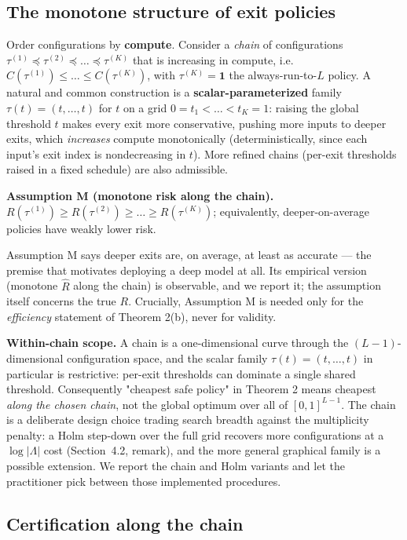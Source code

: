 \documentclass{ieeeaccess}
\begin{document}
\subsection{The monotone structure of exit policies}

Order configurations by \textbf{compute}. Consider a \emph{chain} of configurations $\tau^{(1)}\preceq\tau^{(2)}\preceq\dots\preceq\tau^{(K)}$ that is increasing in compute, i.e. $C(\tau^{(1)})\le\dots\le C(\tau^{(K)})$, with $\tau^{(K)}=\mathbf 1$ the always-run-to-$L$ policy. A natural and common construction is a \textbf{scalar-parameterized} family $\tau(t)=(t,\dots,t)$ for $t$ on a grid $0=t_1<\dots<t_K=1$: raising the global threshold $t$ makes every exit more conservative, pushing more inputs to deeper exits, which \emph{increases} compute monotonically (deterministically, since each input's exit index is nondecreasing in $t$). More refined chains (per-exit thresholds raised in a fixed schedule) are also admissible.

\textbf{Assumption M (monotone risk along the chain).} $R(\tau^{(1)})\ge R(\tau^{(2)})\ge\dots\ge R(\tau^{(K)})$; equivalently, deeper-on-average policies have weakly lower risk.

Assumption M says deeper exits are, on average, at least as accurate --- the premise that motivates deploying a deep model at all. Its empirical version (monotone $\hat R$ along the chain) is observable, and we report it; the assumption itself concerns the true $R$. Crucially, Assumption M is needed only for the \emph{efficiency} statement of Theorem 2(b), never for validity.

\textbf{Within-chain scope.} A chain is a one-dimensional curve through the $(L{-}1)$-dimensional configuration space, and the scalar family $\tau(t)=(t,\dots,t)$ in particular is restrictive: per-exit thresholds can dominate a single shared threshold. Consequently "cheapest safe policy" in Theorem 2 means cheapest \emph{along the chosen chain}, not the global optimum over all of $[0,1]^{L-1}$. The chain is a deliberate design choice trading search breadth against the multiplicity penalty: a Holm step-down over the full grid recovers more configurations at a $\log|\Lambda|$ cost (Section~4.2, remark), and the more general graphical family is a possible extension. We report the chain and Holm variants and let the practitioner pick between those implemented procedures.

\subsection{Certification along the chain}
\end{document}
